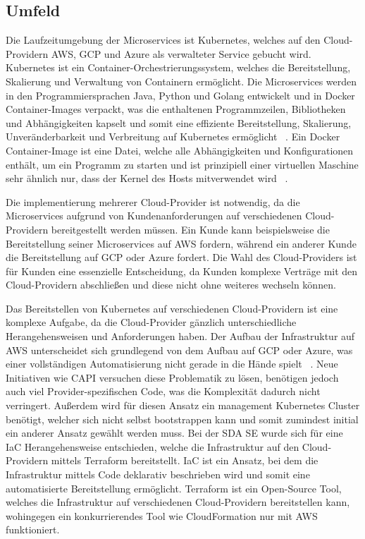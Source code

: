 \subsection{Umfeld}
\label{subsec:description:umfeld}
Die Laufzeitumgebung der Microservices ist Kubernetes, welches auf den Cloud-Providern \ac{AWS}, \ac{GCP} und \ac{Azure} als verwalteter Service gebucht wird.
Kubernetes ist ein Container-Orchestrierungssystem, welches die Bereitstellung, Skalierung und Verwaltung von Containern ermöglicht.
Die Microservices werden in den Programmiersprachen Java, Python und Golang entwickelt und in Docker Container-Images verpackt, was die enthaltenen Programmzeilen, Bibliotheken und Abhängigkeiten kapselt und somit eine effiziente Bereitstellung, Skalierung, Unveränderbarkeit und Verbreitung auf Kubernetes ermöglicht ~\cite{rad2017introduction}.
Ein Docker Container-Image ist eine Datei, welche alle Abhängigkeiten und Konfigurationen enthält, um ein Programm zu starten und ist prinzipiell einer virtuellen Maschine sehr ähnlich nur, dass der Kernel des Hosts mitverwendet wird ~\cite[p.~229]{rad2017introduction}.
\medskip

Die implementierung mehrerer Cloud-Provider ist notwendig, da die Microservices aufgrund von Kundenanforderungen auf verschiedenen Cloud-Providern bereitgestellt werden müssen.
Ein Kunde kann beispielsweise die Bereitstellung seiner Microservices auf AWS fordern, während ein anderer Kunde die Bereitstellung auf GCP oder Azure fordert.
Die Wahl des Cloud-Providers ist für Kunden eine essenzielle Entscheidung, da Kunden komplexe Verträge mit den Cloud-Providern abschließen und diese nicht ohne weiteres wechseln können.
\medskip

Das Bereitstellen von Kubernetes auf verschiedenen Cloud-Providern ist eine komplexe Aufgabe, da die Cloud-Provider gänzlich unterschiedliche Herangehensweisen und Anforderungen haben.
Der Aufbau der Infrastruktur auf AWS unterscheidet sich grundlegend von dem Aufbau auf GCP oder Azure, was einer vollständigen Automatisierung nicht gerade in die Hände spielt ~\cite[p.~450]{khot2020comparative}.
Neue Initiativen wie \ac{CAPI} versuchen diese Problematik zu lösen, benötigen jedoch auch viel Provider-spezifischen Code, was die Komplexität dadurch nicht verringert.
Außerdem wird für diesen Ansatz ein management Kubernetes Cluster benötigt, welcher sich nicht selbst bootstrappen kann und somit zumindest initial ein anderer Ansatz gewählt werden muss.
Bei der SDA SE wurde sich für eine \ac{IaC} Herangehensweise entschieden, welche die Infrastruktur auf den Cloud-Providern mittels Terraform bereitstellt.
IaC ist ein Ansatz, bei dem die Infrastruktur mittels Code deklarativ beschrieben wird und somit eine automatisierte Bereitstellung ermöglicht.
Terraform ist ein Open-Source Tool, welches die Infrastruktur auf verschiedenen Cloud-Providern bereitstellen kann, wohingegen ein konkurrierendes Tool wie CloudFormation nur mit AWS funktioniert.
\medskip

